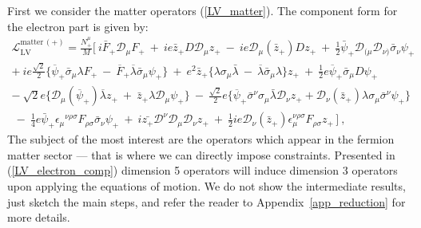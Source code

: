 \documentclass[12pt]{revtex4}
\begin{document}
First we consider the matter operators (\ref{LV_matter}).
The component form for the electron part is given by: 
\begin{gather}
\nonumber
  \mathcal{L}_{\mathrm{LV}}^{\mathrm{matter\,(+)}} 
 = \frac{N_+^\mu}{M} \Big[~
    i \bar{F}_+ \mathcal{D}_\mu F_+ ~+~
    i e \bar{z}_+ D \mathcal{D}_\mu z_+ ~-~
    i e \mathcal{D}_\mu(\bar{z}_+) D z_+ 
~+~ 
  \frac{1}{2}\bar{\psi}_+\mathcal{D}_{(\mu}\mathcal{D}_{\nu)}
               \bar{\sigma}_\nu \psi_+ 
\nonumber \\
  + ~ 
    i e \frac{\sqrt{2}}{2} \Big\{
               \overline{\psi}_+\bar\sigma_\mu\lambda F_+ 
       ~-~
               \overline{F}_+\overline{\lambda} \bar\sigma_\mu \psi_+
                         \Big\}  ~+~
    e^2 \bar{z}_+ \Big\{
               \lambda\sigma_\mu\bar{\lambda} 
       ~-~
               \overline{\lambda}\bar\sigma_\mu\lambda 
                       \Big\} z_+ 
~+~ 
    \frac{1}{2} e \overline{\psi}_+\bar\sigma_\mu D\psi_+
\nonumber \\
\nonumber
 -~ 
   \sqrt{2} e \Big\{ 
                     \mathcal{D}_\mu(\overline{\psi}_+)\overline{\lambda} z_+ 
     ~+~ 
                     \bar{z}_+ \lambda \mathcal{D}_\mu \psi_+ 
                     \Big\} 
    ~-~ 
    \frac{\sqrt{2}}{2} e \Big\{ 
                      \overline{\psi}_+\bar\sigma^\nu\sigma_\mu 
                     \bar{\lambda}\mathcal{D}_\nu z_+ +
                     \mathcal{D}_\nu(\bar{z}_+)\lambda\sigma_\mu
                     \bar{\sigma}^\nu \psi_+
                     \Big\}
   \\
  ~ -~
  \frac{1}{4} e \bar{\psi}_+\epsilon_\mu{}^{\nu\rho\sigma}
              F_{\rho\sigma} \bar{\sigma}_\nu \psi_+
   ~+~
  i \bar{z_+} \mathcal{D}^\nu \mathcal{D}_\mu \mathcal{D}_\nu z_+ 
   ~+~
   \frac{1}{2} i e \mathcal{D}_\nu (\bar{z}_+) \epsilon_\mu^{\nu\rho\sigma}
              F_{\rho\sigma} z_+ \, 
   \Big] ~,
\label{LV_electron_comp}
\end{gather}
        The subject of the most interest are the operators which appear in 
the fermion matter sector --- 
that is where we can directly impose constraints.
Presented in (\ref{LV_electron_comp}) dimension 5 operators will induce
dimension 3 operators upon applying the equations of motion.
We do not show the intermediate results, just sketch
the main steps, and refer the reader to Appendix~\ref{app_reduction} 
for more details.
\end{document}
